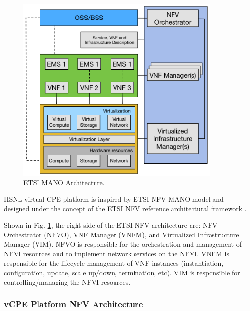 \begin{figure}[!t]
\centering
\includegraphics[width=0.9\textwidth]{./fig/etsi_nfv_architecture}
\caption{ETSI MANO Architecture. \cite{etsi-nfv-archi}}
\label{fig:etsi_nfv_architecture}
\end{figure}

HSNL virtual CPE platform \cite{che-wei-master, che-wei-umedia} is inspired by ETSI NFV MANO model and designed under the concept of the ETSI NFV reference architectural framework \cite{etsi-nfv-archi}.

Shown in Fig. \ref{fig:etsi_nfv_architecture}, the right side of the ETSI-NFV architecture are: NFV Orchestrator (NFVO), VNF Manager (VNFM), and Virtualized Infrastructure Manager (VIM). NFVO is responsible for the orchestration and management of NFVI resources and to implement network services on the NFVI. VNFM is responsible for the lifecycle management of VNF instances (instantiation, configuration, update, scale up/down, termination, etc). VIM is responsible for controlling/managing the NFVI resources.

\subsubsection{vCPE Platform NFV Architecture}

